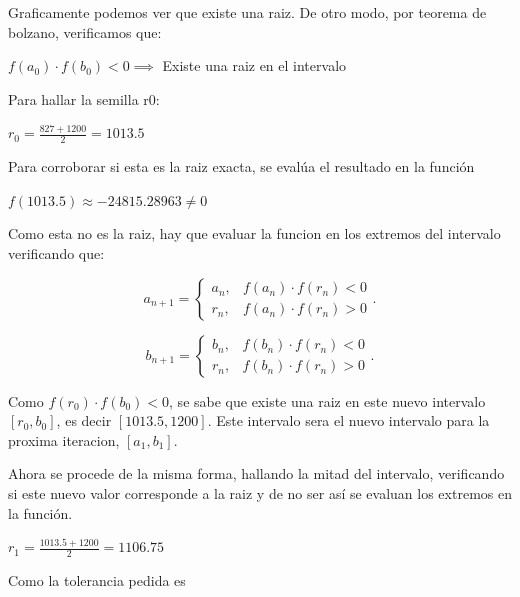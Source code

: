 Graficamente podemos ver que existe una raiz. De otro modo, por teorema de bolzano, verificamos que:
\begin{center} $f(a_0) \cdot f(b_0) < 0 \implies$ Existe una raiz en el intervalo \end{center}

Para hallar la semilla r0:

\begin{center}$r_0 = \frac{827 + 1200}{2} = 1013.5 $\end{center}

Para corroborar si esta es la raiz exacta, se evalúa el resultado en la función

\begin{center}$f(1013.5) \approx -24815.28963 \neq 0 $\end{center}

Como esta no es la raiz, hay que evaluar la funcion en los extremos del intervalo verificando que:


\begin{equation}
        a_{n+1} =
        \begin{cases}{}
            a_n, &\text{$f(a_n) \cdot f(r_n) < 0$}\\
            r_n, &\text{$f(a_n) \cdot f(r_n) > 0$}
        \end{cases}.
\end{equation}

\begin{equation}
        b_{n+1} =
        \begin{cases}{}
            b_n, &\text{$f(b_n) \cdot f(r_n) < 0$}\\
            r_n, &\text{$f(b_n) \cdot f(r_n) > 0$}
        \end{cases}.
\end{equation}

Como $f(r_0) \cdot f(b_0) < 0$, se sabe que existe una raiz en este nuevo intervalo $[r_0,b_0]$, es decir $[1013.5, 1200]$. Este intervalo sera el nuevo intervalo para la proxima iteracion, $[a_1, b_1]$.


Ahora se procede de la misma forma, hallando la mitad del intervalo, verificando si este nuevo valor corresponde a la raiz y de no ser así se evaluan los extremos en la función.

\begin{center}$r_1 = \frac{1013.5 + 1200}{2} = 1106.75 $\end{center}

Como la tolerancia pedida es 


